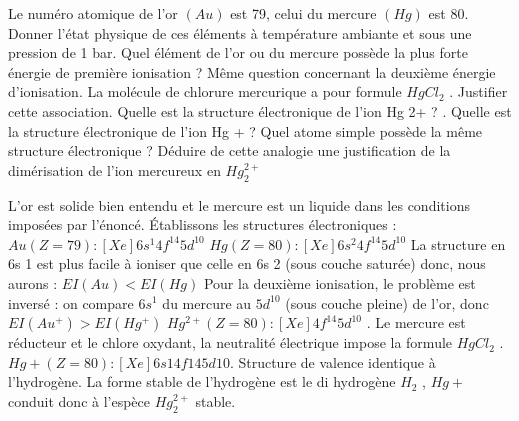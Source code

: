 \begin{Exercise}[title=Or et Mercure]
	Le numéro atomique de l’or $(Au)$ est 79, celui du mercure
	$(Hg)$ est 80.
	\Question Donner l’état physique de ces éléments à température
	ambiante et sous une pression de 1 bar.
	\Question Quel élément de l’or ou du mercure possède la plus forte
	énergie de première ionisation ?
	\Question Même question concernant la deuxième énergie d’ionisation.
	\Question La molécule de chlorure mercurique a pour formule
	$HgCl_2$ . Justifier cette association. Quelle est la structure électronique de l’ion Hg 2+ ?
	\Question. Quelle est la structure électronique de l’ion Hg + ? Quel	atome simple possède la même structure électronique ?	Déduire de cette analogie une justification de la dimérisation de l’ion mercureux en $Hg^{2+}_2$
\end{Exercise}
\begin{Answer}
	\Question L’or est solide bien entendu et le mercure est un liquide dans les conditions imposées par l’énoncé.
	\Question Établissons les structures électroniques :$ Au (Z = 79) : [Xe]6s^1 4f^14 5d^10$
	$Hg (Z = 80) : [Xe]6s^2 4f^14 5d^10$
	La structure en 6s 1 est plus facile à ioniser que celle en 6s 2 (sous couche saturée) donc, nous aurons :
	$EI (Au) < EI (Hg)$
	\Question Pour la deuxième ionisation, le problème est inversé : on compare $6s^1$ du mercure au $5d^10$ (sous couche pleine) de l’or, donc $EI(Au^+) > EI (Hg^+)$
	\Question $Hg^{2+} (Z = 80) : [Xe] 4f^14 5d^10$ . Le mercure est réducteur et le chlore oxydant, la neutralité électrique impose la formule $HgCl_2$ .
	\Question $Hg + (Z = 80) : [Xe]6s 1 4 f 14 5d 10$. Structure de valence identique à l’hydrogène. La forme stable de l’hydrogène est le di	hydrogène $H_2$ , $Hg +$ conduit donc à l’espèce $Hg^{2+}_{2}$ stable.
\end{Answer}
